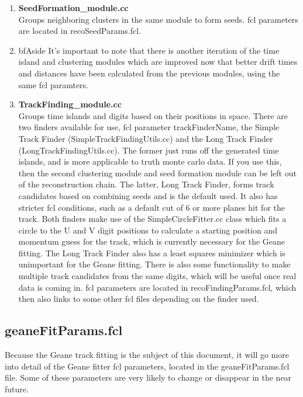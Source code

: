 \documentclass{article}
\begin{document}
\begin{enumerate}
          \item{\bf{SeedFormation\_module.cc}} \\
          Groups neighboring clusters in the same module to form seeds. fcl parameters are located in recoSeedParams.fcl.

          \item{bf{Aside}}
          It's important to note that there is another iteration of the time island and clustering modules which are improved now that better drift times and distances have been calculated from the previous modules, using the same fcl paramters.

          \item{\bf{TrackFinding\_module.cc}} \\
          Groups time islands and digits based on their positions in space. There are two finders available for use, fcl parameter trackFinderName, the Simple Track Finder (SimpleTrackFindingUtils.cc) and the Long Track Finder (LongTrackFindingUtils.cc). The former just runs off the generated time islands, and is more applicable to truth monte carlo data. If you use this, then the second clustering module and seed formation module can be left out of the reconstruction chain. The latter, Long Track Finder, forms track candidates based on combining seeds and is the default used. It also has stricter fcl conditions, such as a default cut of 6 or more planes hit for the track. Both finders make use of the SimpleCircleFitter.cc class which fits a circle to the U and V digit positions to calculate a starting position and momentum guess for the track, which is currently necessary for the Geane fitting. The Long Track Finder also has a least squares minimizer which is unimportant for the Geane fitting. There is also some functionality to make multiple track candidates from the same digits, which will be useful once real data is coming in. fcl parameters are located in recoFindingParams.fcl, which then also links to some other fcl files depending on the finder used.


    \end{enumerate}

  \subsection{geaneFitParams.fcl}

    Because the Geane track fitting is the subject of this document, it will go more into detail of the Geane fitter fcl parameters, located in the geaneFitParams.fcl file. Some of these parameters are very likely to change or disappear in the near future.
\end{document}

